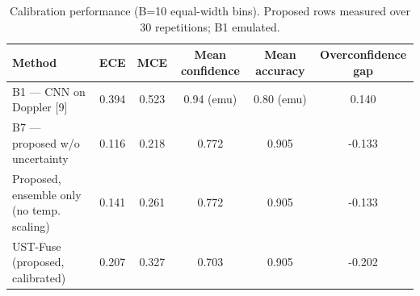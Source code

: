 \begin{table}[t]
\centering
\caption{Calibration performance (B=10 equal-width bins). Proposed rows measured over 30 repetitions; B1 emulated.}
\label{tab:calibration}
\begin{tabular}{lccccc}
\hline
Method & ECE & MCE & Mean confidence & Mean accuracy & Overconfidence gap \\
\hline
B1 — CNN on Doppler [9] & 0.394 & 0.523 & 0.94 (emu) & 0.80 (emu) & 0.140 \\
B7 — proposed w/o uncertainty & 0.116 & 0.218 & 0.772 & 0.905 & -0.133 \\
Proposed, ensemble only (no temp. scaling) & 0.141 & 0.261 & 0.772 & 0.905 & -0.133 \\
UST-Fuse (proposed, calibrated) & 0.207 & 0.327 & 0.703 & 0.905 & -0.202 \\
\hline
\end{tabular}
\end{table}
